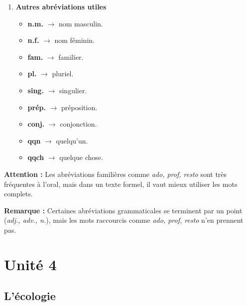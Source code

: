 \documentclass[math,code]{amznotes}
\theoremstyle{remark}
\begin{document}
\begin{enumerate}
    \item \textbf{Autres abréviations utiles}
    \begin{itemize}
        \item \textbf{n.m.} $\rightarrow$ nom masculin.
        \item \textbf{n.f.} $\rightarrow$ nom féminin.
        \item \textbf{fam.} $\rightarrow$ familier.
        \item \textbf{pl.} $\rightarrow$ pluriel.
        \item \textbf{sing.} $\rightarrow$ singulier.
        \item \textbf{prép.} $\rightarrow$ préposition.
        \item \textbf{conj.} $\rightarrow$ conjonction.
        \item \textbf{qqn} $\rightarrow$ quelqu'un.
        \item \textbf{qqch} $\rightarrow$ quelque chose.
    \end{itemize}
\end{enumerate}

\begin{notebox}
\textbf{Attention :} Les abréviations familières comme \textit{ado, prof, resto} sont très fréquentes à l'oral, mais dans un texte formel, il vaut mieux utiliser les mots complets.

\textbf{Remarque :} Certaines abréviations grammaticales se terminent par un point (\textit{adj., adv., n.}), mais les mots raccourcis comme \textit{ado, prof, resto} n'en prennent pas.
\end{notebox}

\section{Unité 4}

\subsection*{L'écologie}
\end{document}
